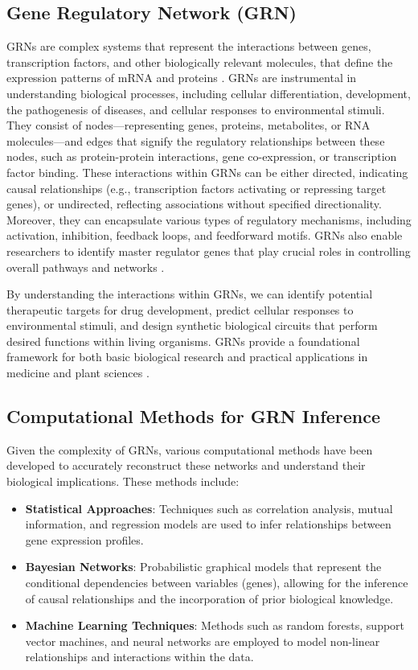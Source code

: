 \documentclass{article}
\begin{document}
\subsection{Gene Regulatory Network (GRN)}
GRNs are complex systems that represent the interactions between genes, transcription factors, and other biologically relevant molecules, that define the expression patterns of mRNA and proteins \cite{Mochida2018}. GRNs are instrumental in understanding biological processes, including cellular differentiation, development, the pathogenesis of diseases, and cellular responses to environmental stimuli\cite{jiang2018analysis,zhang2022identification, zhu2013predicting}. They consist of nodes—representing genes, proteins, metabolites, or RNA molecules—and edges that signify the regulatory relationships between these nodes, such as protein-protein interactions, gene co-expression, or transcription factor binding. These interactions within GRNs can be either directed, indicating causal relationships (e.g., transcription factors activating or repressing target genes), or undirected, reflecting associations without specified directionality. Moreover, they can encapsulate various types of regulatory mechanisms, including activation, inhibition, feedback loops, and feedforward motifs. GRNs also enable researchers to identify master regulator genes that play crucial roles in controlling overall pathways and networks \cite{chai2014review}.

By understanding the interactions within GRNs, we can identify potential therapeutic targets for drug development, predict cellular responses to environmental stimuli, and design synthetic biological circuits that perform desired functions within living organisms. GRNs provide a foundational framework for both basic biological research and practical applications in medicine and plant sciences \cite{chai2014review,madhamshettiwar2012gene}. 

\subsection{Computational Methods for GRN Inference}
Given the complexity of GRNs, various computational methods have been developed to accurately reconstruct these networks and understand their biological implications. These methods include:

\begin{itemize}
    \item \textbf{Statistical Approaches}: Techniques such as correlation analysis, mutual information, and regression models are used to infer relationships between gene expression profiles.
    \item \textbf{Bayesian Networks}: Probabilistic graphical models that represent the conditional dependencies between variables (genes), allowing for the inference of causal relationships and the incorporation of prior biological knowledge.
    \item \textbf{Machine Learning Techniques}: Methods such as random forests, support vector machines, and neural networks are employed to model non-linear relationships and interactions within the data.
\end{itemize}
\end{document}
